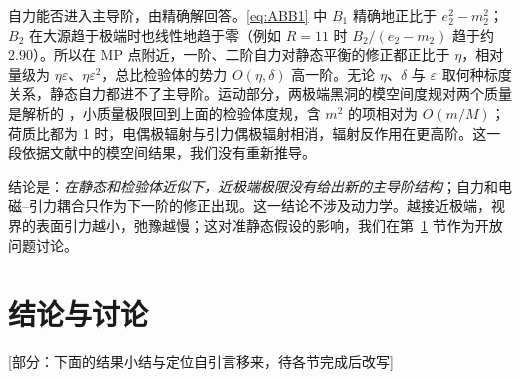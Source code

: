 \documentclass[11pt,a4paper]{ctexart}
\newcommand{\status}[1]{\hfill{\small\color{blue!50!black}[#1]}}
\begin{document}
自力能否进入主导阶，由精确解回答。\eqref{eq:ABB1} 中 $B_1$ 精确地正比于 $e_2^2-m_2^2$；$B_2$ 在大源趋于极端时也线性地趋于零（例如 $R=11$ 时 $B_2/(e_2-m_2)$ 趋于约 $2.90$）。所以在 MP 点附近，一阶、二阶自力对静态平衡的修正都正比于 $\eta$，相对量级为 $\eta\varepsilon$、$\eta\varepsilon^2$，总比检验体的势力 $O(\eta,\delta)$ 高一阶。无论 $\eta$、$\delta$ 与 $\varepsilon$ 取何种标度关系，静态自力都进不了主导阶。运动部分，两极端黑洞的模空间度规对两个质量是解析的 \citep{FerrellEardley1987}，小质量极限回到上面的检验体度规，含 $m^2$ 的项相对为 $O(m/M)$；荷质比都为 1 时，电偶极辐射与引力偶极辐射相消，辐射反作用在更高阶。这一段依据文献中的模空间结果，我们没有重新推导。

结论是：\emph{在静态和检验体近似下，近极端极限没有给出新的主导阶结构}；自力和电磁--引力耦合只作为下一阶的修正出现。这一结论不涉及动力学。越接近极端，视界的表面引力越小，弛豫越慢；这对准静态假设的影响，我们在第~\ref{sec:o-disc} 节作为开放问题讨论。

\section{结论与讨论}\label{sec:o-disc}
\status{部分：下面的结果小结与定位自引言移来，待各节完成后改写}
\end{document}
